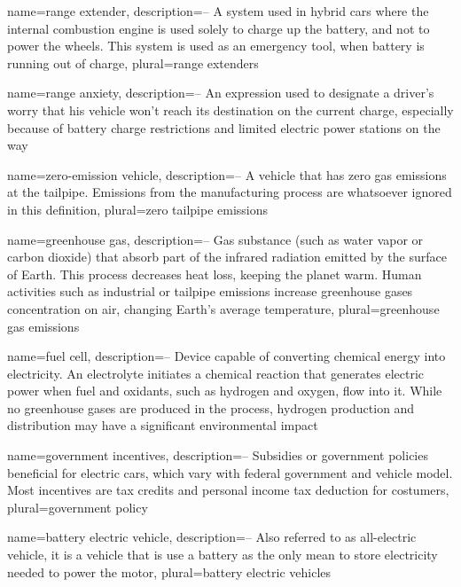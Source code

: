 {
	name=range extender,
	description={-- A system used in hybrid cars where the internal combustion engine is used solely to charge up the battery, and not to power the wheels. This system is used as an emergency tool, when battery is running out of charge},
	plural=range extenders
}

{
	name=range anxiety,
	description={-- An expression used to designate a driver's worry that his vehicle won't reach its destination on the current charge, especially because of battery charge restrictions and limited electric power stations on the way}
}

{
	name=zero-emission vehicle,
	description={-- A vehicle that has zero gas emissions at the tailpipe. Emissions from the manufacturing process are whatsoever ignored in this definition},
	plural=zero tailpipe emissions
}

{
	name=greenhouse gas,
	description={-- Gas substance (such as water vapor or carbon dioxide) that absorb part of the infrared radiation emitted by the surface of Earth. This process decreases heat loss, keeping the planet warm. Human activities such as industrial or tailpipe emissions increase greenhouse gases concentration on air, changing Earth's average temperature},
	plural=greenhouse gas emissions
}

{
	name=fuel cell,
	description={-- Device capable of converting chemical energy into electricity. An electrolyte initiates a chemical reaction that generates electric power when fuel and oxidants, such as hydrogen and oxygen, flow into it. While no greenhouse gases are produced in the process, hydrogen production and distribution may have a significant environmental impact}
}

{
	name=government incentives,
	description={-- Subsidies or government policies beneficial for electric cars, which vary with federal government and vehicle model. Most incentives are tax credits and personal income tax deduction for costumers},
	plural=government policy
}

{
	name=battery electric vehicle,
	description={-- Also referred to as all-electric vehicle, it is a vehicle that is use a battery as the only mean to store electricity needed to power the motor},
	plural=battery electric vehicles
}

